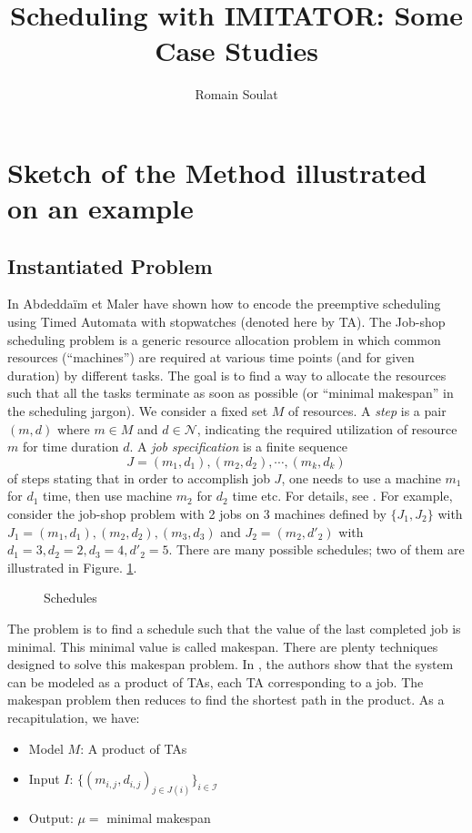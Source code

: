 \documentclass{article}
\title{Scheduling with IMITATOR: Some Case Studies}
\author{Romain Soulat}
\date{}
\begin{document}
\maketitle


\section{Sketch of the Method illustrated on an example}
\subsection{Instantiated Problem}
In \cite{am02} Abdedda\"{i}m et Maler have shown how to encode the preemptive scheduling using Timed Automata with stopwatches (denoted here by TA). The Job-shop scheduling problem is a generic 
resource allocation problem in which common
resources (``machines'') are required at various time points (and for given duration) by different tasks. The goal is to find a way to allocate the resources such that all the tasks terminate
as soon as possible (or ``minimal makespan'' in the scheduling jargon). We consider a fixed set $M$ of resources. A \emph{step} is a pair $(m,d)$ where $m \in M$ and $d \in \mathcal{N}$, indicating 
the required utilization of resource $m$ for time duration $d$. A \emph{job specification} is a finite sequence
$$J = (m_1,d_1),(m_2,d_2),\cdots, (m_k,d_k)$$ of steps stating that in order to accomplish job $J$, one needs to use a machine $m_1$ for $d_1$ time, then use machine $m_2$ for $d_2$ time etc.
For details, see \cite{am02}.
For example, consider the job-shop problem with 2 jobs on 3 machines defined by $\{J_1, J_2\}$ with $J_1 = (m_1,d_1), (m_2,d_2),(m_3,d_3)$ and $J_2 = (m_2,d'_2)$ with $d_1 = 3, d_2=2, d_3=4, d'_2 = 5$.
There are many possible schedules; two of them are illustrated in Figure. \ref{fig:schedules_maler}.
\begin{figure}[!ht]
 \label{fig:schedules_maler}
 \caption{Schedules}
\end{figure}
The problem is to find a schedule such that the value of the last completed job is minimal. This minimal value is called makespan. There are plenty techniques designed to solve this makespan problem. In 
\cite{am02}, the authors show that the system can be modeled as a product of TAs, each TA corresponding to a job. The makespan problem then reduces to find the shortest path in the product.
As a recapitulation, we have:
\begin{itemize}
 \item Model $M$: A product of TAs
 \item Input $I$:  $\{(m_{i,j},d_{i,j})_{j\in J(i)}\}_{i \in \mathcal{I}}$
 \item Output: $\mu =$ minimal makespan
\end{itemize}
\end{document}
